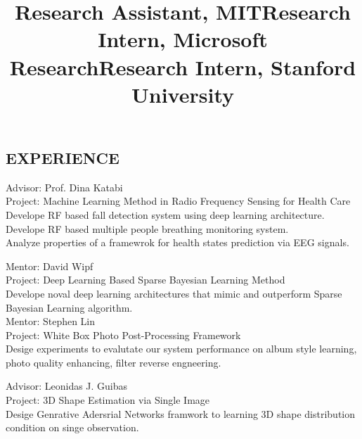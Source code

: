 \documentclass[margin]{res}
\newcommand{\Bullet}[1]{{\raisebox{0.25ex}{\tiny$\bullet$\ }}{#1}\\}
\begin{document}
\begin{resume}
\section{EXPERIENCE}
\title{\textbf{Research Assistant, MIT}}
\begin{position}
    Advisor: Prof. Dina Katabi \\
    Project: Machine Learning Method in Radio Frequency Sensing for Health Care \\
    \Bullet{Develope RF based fall detection system using deep learning architecture.}
    \Bullet{Develope RF based multiple people breathing monitoring system.}
    \Bullet{Analyze properties of a framewrok for health states prediction via EEG signals.}
\end{position}
\vspace{-5mm}

\title{\textbf{Research Intern, Microsoft Research}}
\begin{position}
    Mentor: David Wipf \\
    Project: Deep Learning Based Sparse Bayesian Learning Method \\
    \Bullet{Develope noval deep learning architectures that mimic and outperform Sparse Bayesian Learning algorithm.}
    Mentor: Stephen Lin \\
    Project: White Box Photo Post-Processing Framework \\
    \Bullet{Desige experiments to evalutate our system performance on album style learning, photo quality enhancing, filter reverse engneering.}
\end{position}
\vspace{-5mm}

\title{\textbf{Research Intern, Stanford University}}
\begin{position}
    Advisor: Leonidas J. Guibas \\
    Project: 3D Shape Estimation via Single Image \\
    \Bullet{Desige Genrative Adersrial Networks framwork to learning 3D shape distribution condition on singe observation.}
\end{position}
\vspace{-5mm}


\end{resume}
\end{document}
